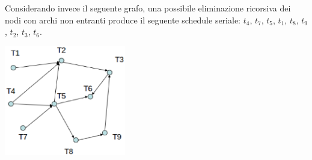 Considerando invece il seguente grafo, una possibile eliminazione ricorsiva dei nodi con archi non entranti
produce il seguente schedule seriale: $t_4$, $t_7$, $t_5$, $t_1$, $t_8$, $t_9$, $t_2$, $t_3$, $t_6$.\\
\begin{center}
\includegraphics[width=200px]{ordinamento_topologico.eps}\\ 
\end{center}

